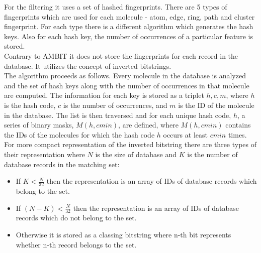 For the filtering it uses a set of hashed fingerprints. There are 5 types of fingerprints which are used for each molecule - atom, edge, ring, path and cluster fingerprint. For each type there is a different algorithm which generates the hash keys. Also for each hash key, the number of occurrences of a particular feature is stored.\\

Contrary to AMBIT it does not store the fingerprints for each record in the database. It utilizes the concept of inverted bitstrings.\\

The algorithm proceeds as follows. Every molecule in the database is analyzed and the set of hash keys along with the number of occurrences in that molecule are computed. The information for each key is stored as a triplet $ {h,c,m} $, where $ h $ is the hash code, $ c $ is the number of occurrences, and $ m $ is the ID of the molecule in the database. The list is then traversed and for each unique hash code, $ h $, a series of binary masks, $ M(h,cmin) $, are defined, where $ M(h,cmin) $ contains the IDs of the molecules for which the hash code $ h $ occurs at least $ cmin $ times.\\

For more compact representation of the inverted bitstring there are three types of their representation where $ N $ is the size of database and $ K $ is the number of database records in the matching set:

\begin{itemize}
	\item If $ K < \frac{N}{32} $ then the representation is an array of IDs of database records which belong to the set.
	\item If $ (N - K) < \frac{N}{32} $ then the representation is an array of IDs of database records which do not belong to the set.
	\item Otherwise it is stored as a classing bitstring where n-th bit represents whether n-th record belongs to the set.
	
\end{itemize}


















